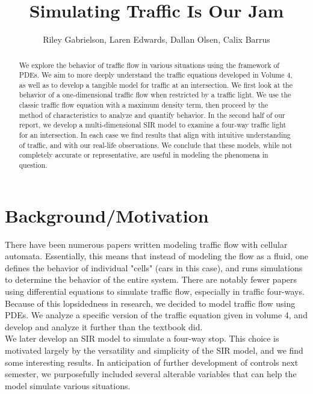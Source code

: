\documentclass[12pt]{article}
\begin{document}
    
    
    \title{Simulating Traffic Is Our Jam}
    \author{Riley Gabrielson, Laren Edwards, Dallan Olsen, Calix Barrus}
    
    \date{}
    
    \maketitle
    
    \begin{abstract}
        
        We explore the behavior of traffic flow in various situations using the framework of PDEs. We aim to more deeply understand the traffic equations developed in Volume 4, as well as to develop a tangible model for traffic at an intersection. We first look at the behavior of a one-dimensional traffic flow when restricted by a traffic light. We use the classic traffic flow equation with a maximum density term, then proceed by the method of characteristics to analyze and quantify behavior. In the second half of our report, we develop a multi-dimensional SIR model to examine a four-way traffic light for an intersection. In each case we find results that align with intuitive understanding of traffic, and with our real-life observations. We conclude that these models, while not completely accurate or representative, are useful in modeling the phenomena in question.
        
    \end{abstract}
    
    \section{Background/Motivation}
    There have been numerous papers\cite{ref1} written modeling traffic flow with cellular automata. Essentially, this means that instead of modeling the flow as a fluid, one defines the behavior of individual "cells" (cars in this case), and runs simulations to determine the behavior of the entire system. There are notably fewer papers using differential equations to simulate traffic flow, especially in traffic four-ways. Because of this lopsidedness in research, we decided to model traffic flow using PDEs. We analyze a specific version of the traffic equation given in volume 4, and develop and analyze it further than the textbook did.\\
    We later develop an SIR model to simulate a four-way stop. This choice is motivated largely by the versatility and simplicity of the SIR model, and we find some interesting results. In anticipation of further development of controls next semester, we purposefully included several alterable variables that can help the model simulate various situations.
    
\end{document}

